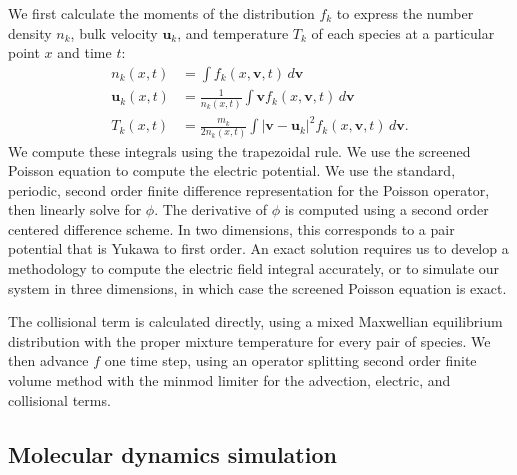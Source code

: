 \documentclass{article}
\begin{document}
We first calculate the moments of the distribution $f_k$ to express the number density $n_k$, bulk velocity $\mathbf{u}_k$, and temperature $T_k$ of each species at a particular point $x$ and time $t$:
\begin{align}
n_k(x,t)&=\int f_k(x,\mathbf{v},t)\,d\mathbf{v}\\
\mathbf{u}_k(x,t)&=\frac{1}{n_k(x,t)}\int \mathbf{v}f_k(x,\mathbf{v},t)\,d\mathbf{v}\\
T_k(x,t)&=\frac{m_k}{2n_k(x,t)}\int |\mathbf{v}-\mathbf{u}_k|^2f_k(x,\mathbf{v},t)\,d\mathbf{v}.
\end{align}
We compute these integrals using the trapezoidal rule. We use the screened Poisson equation to compute the electric potential. We use the standard, periodic, second order finite difference representation for the Poisson operator, then linearly solve for $\phi$. The derivative of $\phi$ is computed using a second order centered difference scheme. In two dimensions, this corresponds to a pair potential that is Yukawa to first order. An exact solution requires us to develop a methodology to compute the electric field integral accurately, or to simulate our system in three dimensions, in which case the screened Poisson equation is exact.

The collisional term is calculated directly, using a mixed Maxwellian equilibrium distribution with the proper mixture temperature for every pair of species. We then advance $f$ one time step, using an operator splitting second order finite volume method with the minmod limiter for the advection, electric, and collisional terms. 

\subsection{Molecular dynamics simulation}
\end{document}
